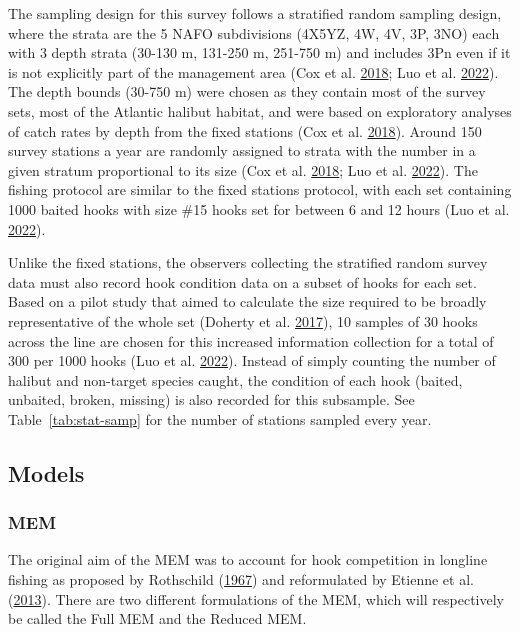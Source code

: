 \documentclass[12pt]{article}\usepackage[]{graphicx}\usepackage[]{color}
\begin{document}
The sampling design for this survey follows a stratified random sampling design, where the strata are the 5 NAFO subdivisions (4X5YZ, 4W, 4V, 3P, 3NO) each with 3 depth strata (30-130 m, 131-250 m, 251-750 m) and includes 3Pn even if it is not explicitly part of the management area (Cox et al. \protect\hyperlink{ref-Cox2018}{2018}; Luo et al. \protect\hyperlink{ref-Luo2022}{2022}). The depth bounds (30-750 m) were chosen as they contain most of the survey sets, most of the Atlantic halibut habitat, and were based on exploratory analyses of catch rates by depth from the fixed stations (Cox et al. \protect\hyperlink{ref-Cox2018}{2018}). Around 150 survey stations a year are randomly assigned to strata with the number in a given stratum proportional to its size (Cox et al. \protect\hyperlink{ref-Cox2018}{2018}; Luo et al. \protect\hyperlink{ref-Luo2022}{2022}). The fishing protocol are similar to the fixed stations protocol, with each set containing 1000 baited hooks with size \#15 hooks set for between 6 and 12 hours (Luo et al. \protect\hyperlink{ref-Luo2022}{2022}).

Unlike the fixed stations, the observers collecting the stratified random survey data must also record hook condition data on a subset of hooks for each set. Based on a pilot study that aimed to calculate the size required to be broadly representative of the whole set (Doherty et al. \protect\hyperlink{ref-Doherty2017}{2017}), 10 samples of 30 hooks across the line are chosen for this increased information collection for a total of 300 per 1000 hooks (Luo et al. \protect\hyperlink{ref-Luo2022}{2022}). Instead of simply counting the number of halibut and non-target species caught, the condition of each hook (baited, unbaited, broken, missing) is also recorded for this subsample. See Table~\ref{tab:stat-samp} for the number of stations sampled every year.

\hypertarget{models}{%
\subsection{Models}\label{models}}

\hypertarget{mem}{%
\subsubsection{MEM}\label{mem}}

The original aim of the MEM was to account for hook competition in longline fishing as proposed by Rothschild (\protect\hyperlink{ref-Rothschild1967}{1967}) and reformulated by Etienne et al. (\protect\hyperlink{ref-Etienne2013}{2013}). There are two different formulations of the MEM, which will respectively be called the Full MEM and the Reduced MEM.
\end{document}
